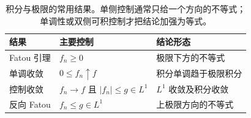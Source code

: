 \begin{table}[htbp]
\centering
\small
\renewcommand{\arraystretch}{1.17}
\begin{tabularx}{\linewidth}{@{}>{\raggedright\arraybackslash}p{7.1em} >{\raggedright\arraybackslash}p{15.7em} >{\raggedright\arraybackslash}X@{}}
\toprule
\textbf{结果} & \textbf{主要控制} & \textbf{结论形态} \\
\midrule
Fatou 引理 & \(f_n\geq0\) & 极限下方的不等式 \\
单调收敛 & \(0\leq f_n\uparrow f\) & 积分单调趋于极限积分 \\
控制收敛 & \(f_n\to f\) 且 \(|f_n|\leq g\in L^1\) & \(L^1\) 收敛及积分收敛 \\
反向 Fatou & \(f_n\leq g\in L^1\) & 上极限方向的不等式 \\
\bottomrule
\end{tabularx}
\caption[积分与极限的常用结果]{积分与极限的常用结果。单侧控制通常只给一个方向的不等式；单调性或双侧可积控制才把结论加强为等式。}
\label{b1:tab:integral-convergence-theorems}
\end{table}
